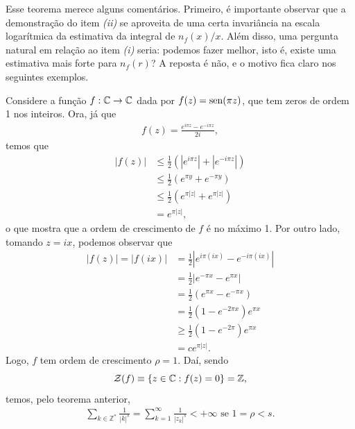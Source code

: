     Esse teorema merece alguns comentários. Primeiro, é importante observar que
    a demonstração do item {\it (ii)} se aproveita de uma certa 
    invariância na escala logarítmica da estimativa da integral
    de $n_{f}(x)/x$. Além disso, uma pergunta natural em relação ao item
    {\it (i)} seria: podemos fazer melhor, isto é, existe uma 
    estimativa mais forte para
    $n_f(r)$? A reposta é não, e o motivo fica claro nos seguintes exemplos.
    \begin{exemplo}
        Considere a função $f:\mathbb{C}\to\mathbb{C}$ dada por $f(z) = \operatorname{sen}(\pi z)$, que tem
        zeros de ordem 1 nos inteiros. Ora, já que
        \begin{align*}
            f(z) = \frac{e^{i\pi z} - e^{-i\pi z}}{2i},
        \end{align*}
        temos que
        \begin{align*}
            |f(z)| &\leq \frac{1}{2}\left( |e^{i\pi z}| + |e^{-i\pi z}| \right) \\
                   &\leq \frac{1}{2}\left( e^{\pi y} + e^{-\pi y} \right) \\
                   &\leq \frac{1}{2}\left( e^{\pi |z|} + e^{\pi |z|} \right) \\
                   &= e^{\pi |z|},
        \end{align*}
        o que mostra que a ordem de crescimento de $f$ é no máximo 1. Por outro lado,
        tomando $z = ix$, podemos observar que
        \begin{align*}
            |f(z)|=|f(ix)|&=\frac{1}{2}\left| e^{i\pi (ix)} - e^{-i\pi (ix)} \right| \\
                          &= \frac{1}{2}\left| e^{-\pi x} - e^{\pi x} \right| \\
                          &= \frac{1}{2} \left( e^{\pi x} - e^{-\pi x} \right) \\
                          &= \frac{1}{2}\left( 1 - e^{-2\pi x} \right)e^{\pi x} \\
                          &\geq \frac{1}{2}\left( 1 - e^{-2\pi} \right)e^{\pi x} \\
                          &= ce^{\pi |z|}.
        \end{align*}
        Logo, $f$ tem ordem de crescimento $\rho = 1$. Daí, sendo
        \begin{equation*}
            \mathcal{Z}(f) \equiv \{ z\in\mathbb{C} : f(z) = 0 \} = \mathbb{Z},
        \end{equation*}
        temos, pelo teorema anterior,
        \begin{align*}
            \sum_{k\in\mathbb{Z}^*} \frac{1}{|k|^s} 
            = \sum_{k=1}^{\infty} \frac{1}{|z_k|^s} < +\infty \text{ se } 1 = \rho < s.
        \end{align*}
    \end{exemplo}
